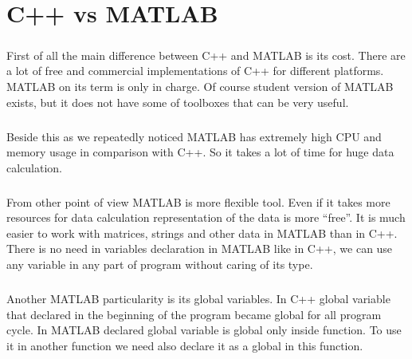 
\chapter{C++  vs MATLAB} %

\label{Chapter9} %



\paragraph{}
	First of all the main difference between C++ and MATLAB is its cost. There are a lot of free and commercial implementations of C++ for different platforms. MATLAB on its term is only in charge. Of course student version of MATLAB exists, but it does not have some of toolboxes that can be very useful. 

\paragraph{}
	Beside this as we repeatedly noticed MATLAB has extremely high CPU and memory usage in comparison with C++. So it takes a lot of time for huge data calculation.

\paragraph{}
	From other point of view MATLAB is more flexible tool. Even if it takes more resources for data calculation representation of the data is more “free”. It is much easier to work with matrices, strings and other data in MATLAB than in C++. There is no need in variables declaration in MATLAB like in C++, we can use any variable in any part of program without caring of its type.

\paragraph{}
	Another MATLAB particularity is its global variables. In C++ global variable that declared in the beginning of the program became global for all program cycle. In MATLAB declared global variable is global only inside function. To use it in another function we need also declare it as a global in this function.

